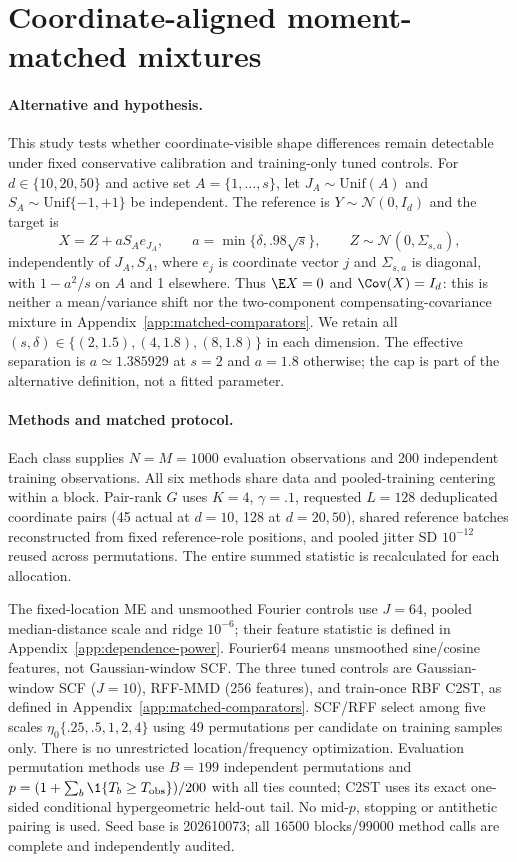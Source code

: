 \section{Coordinate-aligned moment-matched mixtures}\label{app:axis-mixture}
\paragraph{Alternative and hypothesis.}
This study tests whether coordinate-visible shape differences remain detectable
under fixed conservative calibration and training-only tuned controls. For
$d\in\{10,20,50\}$ and active set $A=\{1,\ldots,s\}$, let
$J_A\sim\mathrm{Unif}(A)$ and $S_A\sim\mathrm{Unif}\{-1,+1\}$ be independent.
The reference is $Y\sim\mathcal N(0,I_d)$ and the target is
\[
 X=Z+aS_A e_{J_A},\qquad
 a=\min\{\delta,.98\sqrt{s}\},\qquad
 Z\sim\mathcal N(0,\Sigma_{s,a}),
\]
independently of $J_A,S_A$, where $e_j$ is coordinate vector $j$ and
$\Sigma_{s,a}$ is diagonal, with $1-a^2/s$ on $A$ and 1 elsewhere.
Thus $\E X=0$ and $\Cov(X)=I_d$: this is neither a mean/variance shift nor
the two-component compensating-covariance mixture in
Appendix~\ref{app:matched-comparators}. We retain all
$(s,\delta)\in\{(2,1.5),(4,1.8),(8,1.8)\}$ in each dimension.
The effective separation is $a\simeq1.385929$ at $s=2$ and $a=1.8$ otherwise;
the cap is part of the alternative definition, not a fitted parameter.

\paragraph{Methods and matched protocol.}
Each class supplies $N=M=1000$ evaluation observations and 200 independent
training observations. All six methods share data and pooled-training centering
within a block. Pair-rank $G$ uses $K=4$, $\gamma=.1$, requested $L=128$
deduplicated coordinate pairs (45 actual at $d=10$, 128 at $d=20,50$),
shared reference batches reconstructed from fixed reference-role positions,
and pooled jitter SD $10^{-12}$ reused across permutations.
The entire summed statistic is recalculated for each allocation.

The fixed-location ME and unsmoothed Fourier controls use $J=64$, pooled
median-distance scale and ridge $10^{-6}$; their feature statistic is defined
in Appendix~\ref{app:dependence-power}. Fourier64 means unsmoothed sine/cosine
features, not Gaussian-window SCF. The three tuned controls are Gaussian-window
SCF ($J=10$), RFF-MMD (256 features), and train-once RBF C2ST, as defined in
Appendix~\ref{app:matched-comparators}. SCF/RFF select among five scales
$\eta_0\{.25,.5,1,2,4\}$ using 49 permutations per candidate on training
samples only. There is no unrestricted location/frequency optimization.
Evaluation permutation methods use $B=199$ independent permutations and
$p=(1+\sum_b\1\{T_b\ge T_{\rm obs}\})/200$ with all ties counted;
C2ST uses its exact one-sided conditional hypergeometric held-out tail.
No mid-$p$, stopping or antithetic pairing is used. Seed base is 202610073;
all $16500$ blocks/$99000$ method calls are complete and independently audited.

